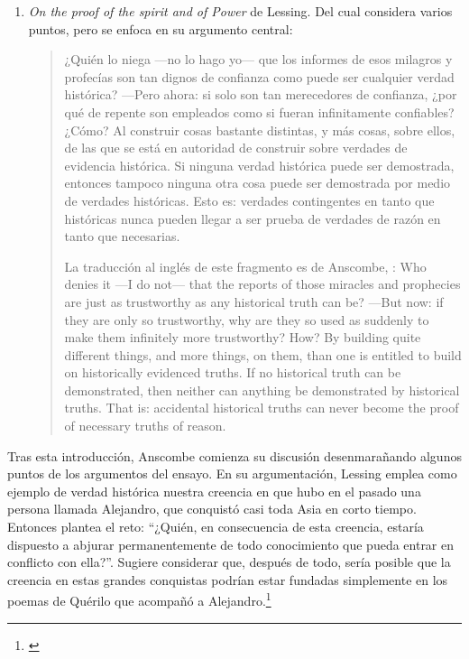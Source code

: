 \begin{enumerate}
{    las palabras de ese profeta o visionario soñador. (Dt 13, 1--4a)}
\item \emph{On the proof of the spirit and of Power} de Lessing. Del cual
  considera varios puntos, pero se enfoca en su argumento central:
  \blockquote[La traducción al inglés de este fragmento es de Anscombe,
  {\cite[Cf.~][22]{anscombe2008faith:prophandmi}}: Who denies it ---I do not---
  that the reports of those miracles and prophecies are just as trustworthy as
  any historical truth can be? ---But now: if they are only so trustworthy, why
  are they so used as suddenly to make them infinitely more trustworthy? How? By
  building quite different things, and more things, on them, than one is
  entitled to build on historically evidenced truths. If no historical truth can
  be demonstrated, then neither can anything be demonstrated by historical
  truths. That is: accidental historical truths can never become the proof of
  necessary truths of reason.]{¿Quién lo niega ---no lo hago yo--- que los
    informes de esos milagros y profecías son tan dignos de confianza como puede
    ser cualquier verdad histórica? ---Pero ahora: si solo son tan merecedores
    de confianza, ¿por qué de repente son empleados como si fueran infinitamente
    confiables? ¿Cómo? Al construir cosas bastante distintas, y más cosas, sobre
    ellos, de las que se está en autoridad de construir sobre verdades de
    evidencia histórica. Si ninguna verdad histórica puede ser demostrada,
    entonces tampoco ninguna otra cosa puede ser demostrada por medio de
    verdades históricas. Esto es: verdades contingentes en tanto que históricas
    nunca pueden llegar a ser prueba de verdades de razón en tanto que
    necesarias.}
\end{enumerate}

Tras esta introducción, Anscombe comienza su discusión desenmarañando algunos
puntos de los argumentos del ensayo. En su argumentación, Lessing emplea como
ejemplo de verdad histórica nuestra creencia en que hubo en el pasado una
persona llamada Alejandro, que conquistó casi toda Asia en corto tiempo.
Entonces plantea el reto: \enquote{¿Quién, en consecuencia de esta creencia,
  estaría dispuesto a abjurar permanentemente de todo conocimiento que pueda
  entrar en conflicto con ella?}. Sugiere considerar que, después de todo, sería
posible que la creencia en estas grandes conquistas podrían estar fundadas
simplemente en los poemas de Quérilo que acompañó a
Alejandro.\footnote{\cite[Cf.~][448]{lessing1982escritos:demo}}

